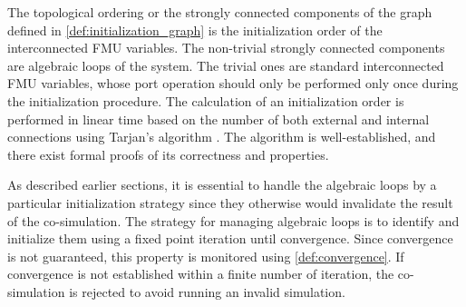 The topological ordering or the strongly connected components of the graph defined in \cref{def:initialization_graph} is the initialization order of the interconnected FMU variables. 
The non-trivial strongly connected components are algebraic loops of the system. The trivial ones are standard interconnected FMU variables, whose port operation should only be performed only once during the initialization procedure.
The calculation of an initialization order is performed in linear time based on the number of both external and internal connections using Tarjan's algorithm \cite{tarjan_1972}. 
The algorithm is well-established, and there exist formal proofs of its correctness and properties\cite{stefanMerz}. 

As described earlier sections, it is essential to handle the algebraic loops by a particular initialization strategy since they otherwise would invalidate the result of the co-simulation. The strategy for managing algebraic loops is to identify and initialize them using a fixed point iteration until convergence. Since convergence is not guaranteed, this property is monitored using \cref{def:convergence}. If convergence is not established within a finite number of iteration, the co-simulation is rejected to avoid running an invalid simulation.


